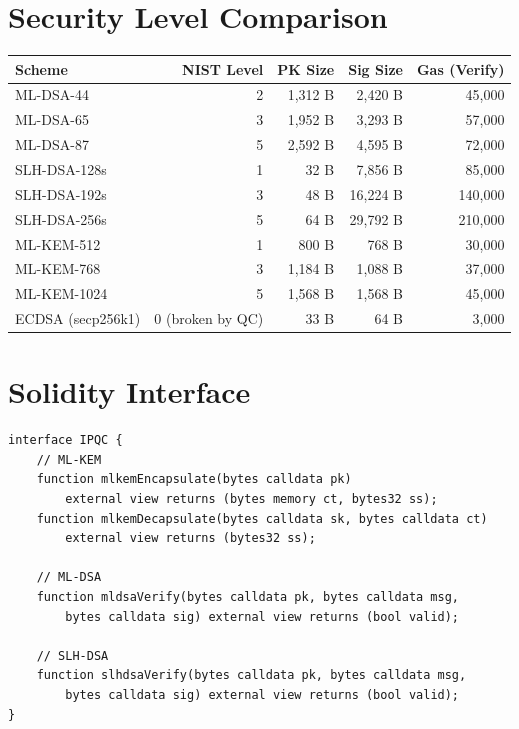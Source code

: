 \documentclass[11pt,letterpaper]{article}
\begin{document}
\section{Security Level Comparison}

\begin{table}[h]
\centering
\small
\begin{tabular}{lrrrr}
\toprule
\textbf{Scheme} & \textbf{NIST Level} & \textbf{PK Size} & \textbf{Sig Size} & \textbf{Gas (Verify)} \\
\midrule
ML-DSA-44 & 2 & 1,312 B & 2,420 B & 45,000 \\
ML-DSA-65 & 3 & 1,952 B & 3,293 B & 57,000 \\
ML-DSA-87 & 5 & 2,592 B & 4,595 B & 72,000 \\
SLH-DSA-128s & 1 & 32 B & 7,856 B & 85,000 \\
SLH-DSA-192s & 3 & 48 B & 16,224 B & 140,000 \\
SLH-DSA-256s & 5 & 64 B & 29,792 B & 210,000 \\
ML-KEM-512 & 1 & 800 B & 768 B & 30,000 \\
ML-KEM-768 & 3 & 1,184 B & 1,088 B & 37,000 \\
ML-KEM-1024 & 5 & 1,568 B & 1,568 B & 45,000 \\
\midrule
ECDSA (secp256k1) & 0 (broken by QC) & 33 B & 64 B & 3,000 \\
\bottomrule
\end{tabular}
\end{table}

\section{Solidity Interface}

\begin{lstlisting}[basicstyle=\ttfamily\small,frame=single]
interface IPQC {
    // ML-KEM
    function mlkemEncapsulate(bytes calldata pk)
        external view returns (bytes memory ct, bytes32 ss);
    function mlkemDecapsulate(bytes calldata sk, bytes calldata ct)
        external view returns (bytes32 ss);

    // ML-DSA
    function mldsaVerify(bytes calldata pk, bytes calldata msg,
        bytes calldata sig) external view returns (bool valid);

    // SLH-DSA
    function slhdsaVerify(bytes calldata pk, bytes calldata msg,
        bytes calldata sig) external view returns (bool valid);
}
\end{lstlisting}
\end{document}
